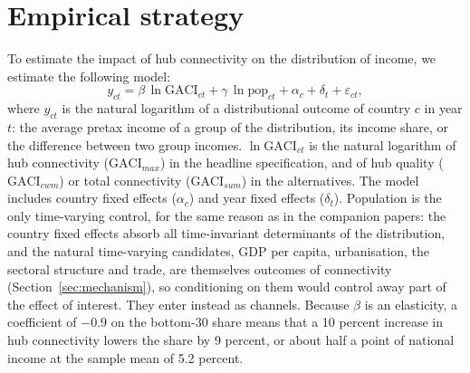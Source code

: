 \section{Empirical strategy}
\label{sec:strategy}
To estimate the impact of hub connectivity on the distribution of income, we estimate the following model:
\begin{equation}
y_{ct} = \beta\,\ln\mathrm{GACI}_{ct} + \gamma\,\ln\text{pop}_{ct} + \alpha_c + \delta_t + \varepsilon_{ct},
\label{eq:main}
\end{equation}
where $y_{ct}$ is the natural logarithm of a distributional outcome of country $c$ in year $t$: the average pretax income of a group of the distribution, its income share, or the difference between two group incomes. $\ln\mathrm{GACI}_{ct}$ is the natural logarithm of hub connectivity ($\mathrm{GACI}_{max}$) in the headline specification, and of hub quality ($\mathrm{GACI}_{cwm}$) or total connectivity ($\mathrm{GACI}_{sum}$) in the alternatives. The model includes country fixed effects ($\alpha_c$) and year fixed effects ($\delta_t$). Population is the only time-varying control, for the same reason as in the companion papers: the country fixed effects absorb all time-invariant determinants of the distribution, and the natural time-varying candidates, GDP per capita, urbanisation, the sectoral structure and trade, are themselves outcomes of connectivity (Section~\ref{sec:mechanism}), so conditioning on them would control away part of the effect of interest. They enter instead as channels. Because $\beta$ is an elasticity, a coefficient of $-0.9$ on the bottom-30 share means that a 10 percent increase in hub connectivity lowers the share by 9 percent, or about half a point of national income at the sample mean of 5.2 percent.

